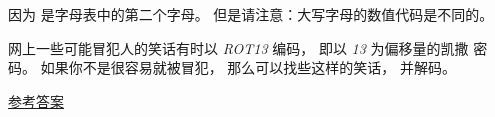 \begin{exercise}

因为 {\em {}} 是字母表中的第二个字母。  但是请注意：大写字母的数值代码是不同的。


网上一些可能冒犯人的笑话有时以 {\em ROT13} 编码， 即以 {\em 13} 为偏移量的凯撒
密码。  如果你不是很容易就被冒犯， 那么可以找些这样的笑话， 并解码。

\href{http://thinkpython2.com/code/rotate.py}{参考答案}

\end{exercise}